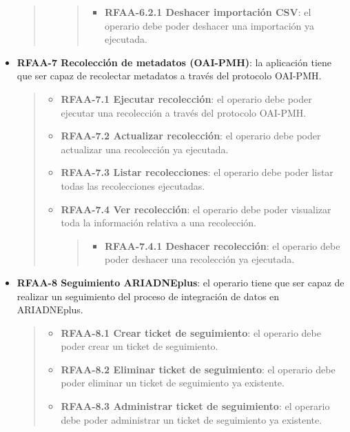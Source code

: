 \begin{itemize}
\begin{quote}
\begin{itemize}
    \begin{quote}
    \begin{itemize}
    \tightlist
    \item
      \textbf{RFAA-6.2.1 Deshacer importación CSV}: el operario debe
      poder deshacer una importación ya ejecutada.
    \end{itemize}
    \end{quote}
  \end{itemize}
  \end{quote}
\item
  \textbf{RFAA-7 Recolección de metadatos (OAI-PMH)}: la aplicación
  tiene que ser capaz de recolectar metadatos a través del protocolo
  OAI-PMH.

  \begin{quote}
  \begin{itemize}
  \item
    \textbf{RFAA-7.1 Ejecutar recolección}: el operario debe poder
    ejecutar una recolección a través del protocolo OAI-PMH.
  \item
    \textbf{RFAA-7.2 Actualizar recolección}: el operario debe poder
    actualizar una recolección ya ejecutada.
  \item
    \textbf{RFAA-7.3 Listar recolecciones}: el operario debe poder
    listar todas las recolecciones ejecutadas.
  \item
    \textbf{RFAA-7.4 Ver recolección}: el operario debe poder visualizar
    toda la información relativa a una recolección.

    \begin{quote}
    \begin{itemize}
    \tightlist
    \item
      \textbf{RFAA-7.4.1 Deshacer recolección}: el operario debe poder
      deshacer una recolección ya ejecutada.
    \end{itemize}
    \end{quote}
  \end{itemize}
  \end{quote}
\item
  \textbf{RFAA-8 Seguimiento ARIADNEplus}: el operario tiene que ser
  capaz de realizar un seguimiento del proceso de integración de datos
  en ARIADNEplus.

  \begin{quote}
  \begin{itemize}
  \item
    \textbf{RFAA-8.1 Crear ticket de seguimiento}: el operario debe
    poder crear un ticket de seguimiento.
  \item
    \textbf{RFAA-8.2 Eliminar ticket de seguimiento}: el operario debe
    poder eliminar un ticket de seguimiento ya existente.
  \item
    \textbf{RFAA-8.3 Administrar ticket de seguimiento}: el operario
    debe poder administrar un ticket de seguimiento ya existente.


\end{itemize}
\end{quote}
\end{itemize}
